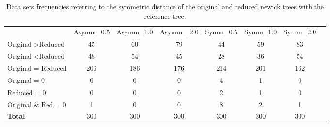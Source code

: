 \documentclass[12pt]{article}
\begin{document}
\begin{table}[H]
	\small\addtolength{\tabcolsep}{-5pt}
	\begin{tabular}{l|c|c|c|c|c|c|l}
		\cline{2-7}
		\textbf{} & \multicolumn{1}{l|}{Asymm\_0.5} & \multicolumn{1}{l|}{Asymm\_1.0} & \multicolumn{1}{l|}{Asymm\_ 2.0} & \multicolumn{1}{l|}{Symm\_0.5} & \multicolumn{1}{l|}{Symm\_1.0} & \multicolumn{1}{l|}{Symm\_2.0} &  \\ \cline{1-7}
		\multicolumn{1}{|l|}{Original \textgreater Reduced} & 45 & 60 & 79 & 44 & 59 & 83 &  \\ \cline{1-7}
		\multicolumn{1}{|l|}{Original \textless Reduced} & 48 & 54 & 45 & 28 & 36 & 54 &  \\ \cline{1-7}
		\multicolumn{1}{|l|}{Original = Reduced} & 206 & 186 & 176 & 214 & 201 & 162 &  \\ \cline{1-7}
		\multicolumn{1}{|l|}{Original = 0} & 0 & 0 & 0 & 4 & 1 & 0 &  \\ \cline{1-7}
		\multicolumn{1}{|l|}{Reduced = 0} & 0 & 0 & 0 & 2 & 1 & 0 &  \\ \cline{1-7}
		\multicolumn{1}{|l|}{Original \& Red = 0} & 1 & 0 & 0 & 8 & 2 & 1 &  \\ \cline{1-7}
		\multicolumn{1}{|l|}{\textbf{Total}} & 300 & 300 & 300 & 300 & 300 & 300 &  \\ \cline{1-7}
	\end{tabular}
\caption{Data sets frequencies referring to the symmetric distance of the original and reduced newick trees with the reference tree.}
\label{table:freqtable}
\end{table}
\end{document}
